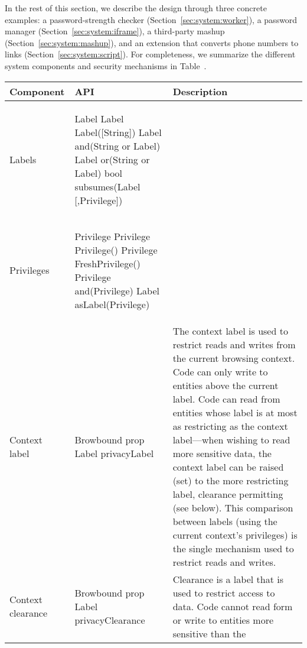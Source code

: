 In the rest of this section, we describe the \sys{} design through
three concrete examples: 
a password-strength checker (Section~\ref{sec:system:worker}),
a password manager (Section~\ref{sec:system:iframe}), 
a third-party mashup (Section~\ref{sec:system:mashup}), and
an extension that converts phone numbers to links
(Section~\ref{sec:system:script}).  %
%
For completeness, we summarize the different system components and
security mechanisms in Table~.

\begin{table*}[t]
\centering
\begin{tabular}{l | m{2.35in} | m{3.5in}}
\hline
\textbf{Component} & \textbf{API} & \textbf{Description} 
\\\hline %
Labels &  
\begin{webidl}
Label {
  Label Label([String])
  Label and(String or Label)
  Label or(String or Label)
  bool subsumes(Label [,Privilege])
}
\end{webidl}
&
\\\hline %
Privileges &  
\begin{webidl}
Privilege {
  Privilege Privilege()
  Privilege FreshPrivilege()
  Privilege and(Privilege)
  Label asLabel(Privilege)
}
\end{webidl}
&
\\\hline %
Context label &  
\begin{webidl}
Browbound {
  prop Label privacyLabel
}
\end{webidl}
&
The context label is used to restrict reads and writes from the
current browsing context.
%
Code can only write to entities above the current label.
%
Code can read from entities whose label is at most as restricting as
the context label---when wishing to read more sensitive data, the
context label can be raised (set) to the more restricting label,
clearance permitting (see below).
%
This comparison between labels (using the current context's
privileges) is the single mechanism used to restrict reads and writes.
\\\hline %
Context clearance  &  
\begin{webidl}
Browbound {
  prop Label privacyClearance
}
\end{webidl}
&
Clearance is a label that is used to restrict access to data.
%
Code cannot read form or write to entities more sensitive than the

\end{tabular}
\end{table*}
